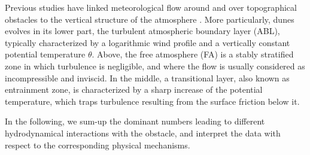   Previous studies have linked meteorological flow around and over topographical obstacles to the vertical structure of the atmosphere \citep{Stull1988}. More particularly, dunes evolves in its lower part, the turbulent atmospheric boundary layer (ABL), typically characterized by a logarithmic wind profile and a vertically constant potential temperature $\theta$. Above, the free atmosphere (FA) is a stably stratified zone in which turbulence is negligible, and where the flow is usually considered as incompressible and inviscid. In the middle, a transitional layer, also known as entrainment zone, is characterized by a sharp increase of the potential temperature, which traps turbulence resulting from the surface friction below it.

  In the following, we sum-up the dominant numbers leading to different hydrodynamical interactions with the obstacle, and interpret the data with respect to the corresponding physical mechanisms.

